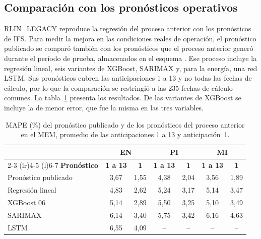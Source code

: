 \subsection{Comparación con los pronósticos operativos}
\label{subsec:comparacion_operativa}

RLIN\_LEGACY reproduce la regresión del proceso anterior con los pronósticos de IFS. Para medir la mejora en las condiciones reales de operación, el pronóstico publicado se comparó también con los pronósticos que el proceso anterior generó durante el período de prueba, almacenados en el esquema . Ese proceso incluye la regresión lineal, seis variantes de XGBoost, SARIMAX y, para la energía, una red LSTM. Sus pronósticos cubren las anticipaciones 1 a 13 y no todas las fechas de cálculo, por lo que la comparación se restringió a las 235 fechas de cálculo comunes. La tabla~\ref{tab:resultados_legacy} presenta los resultados. De las variantes de XGBoost se incluye la de menor error, que fue la misma en las tres variables.

\begin{table}[H]
	\centering
	\caption{MAPE (\%) del pronóstico publicado y de los pronósticos del proceso anterior en el MEM, promedio de las anticipaciones 1 a 13 y anticipación~1.}
	\label{tab:resultados_legacy}
	\small
	\setlength{\tabcolsep}{4pt}
	\renewcommand{\arraystretch}{1.15}
	\begin{tabular*}{\textwidth}{@{\extracolsep{\fill}}lcccccc@{}}
		\toprule
		& \multicolumn{2}{c}{\textbf{EN}} & \multicolumn{2}{c}{\textbf{PI}} & \multicolumn{2}{c}{\textbf{MI}} \\
		\cmidrule(lr){2-3} \cmidrule(lr){4-5} \cmidrule(l){6-7}
		\textbf{Pronóstico} & \textbf{1 a 13} & \textbf{1} & \textbf{1 a 13} & \textbf{1} & \textbf{1 a 13} & \textbf{1} \\
		\midrule
		Pronóstico publicado & 3,67 & 1,55 & 4,38 & 2,04 & 3,56 & 1,89 \\
		Regresión lineal & 4,83 & 2,62 & 5,24 & 3,17 & 5,14 & 3,47 \\
		XGBoost 06 & 5,14 & 2,89 & 5,50 & 3,25 & 5,10 & 3,49 \\
		SARIMAX & 6,14 & 3,40 & 5,75 & 3,42 & 6,16 & 4,63 \\
		LSTM & 6,55 & 4,09 & -- & -- & -- & -- \\
		\bottomrule
	\end{tabular*}
\end{table}

